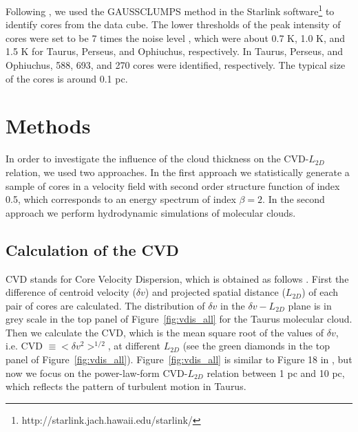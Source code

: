 \documentclass[iop,revtex4]{emulateapj}
\begin{document}
Following \citet{Qian2012}, we used the GAUSSCLUMPS method in the Starlink software\footnote{http://starlink.jach.hawaii.edu/starlink/} to identify cores from the data cube. The lower thresholds of the peak intensity of cores were set to be 7 times the noise level \citep[see][]{Qian2012}, which were about 0.7 K, 1.0 K, and 1.5 K for Taurus, Perseus, and Ophiuchus, respectively. In Taurus, Perseus, and Ophiuchus, 588, 693, and 270 cores were identified, respectively. The typical size of the cores is around 0.1 pc.



\section{Methods}
\label{sec:methods}

In order to investigate the influence of the cloud thickness on the CVD-$L_{2D}$ relation, we used two approaches.
In the first approach we statistically generate a sample of cores in a velocity field with second order structure function of index 0.5, which corresponds to an energy spectrum of index $\beta=2$. In the second approach we perform hydrodynamic simulations of molecular clouds.


\subsection{Calculation of the CVD}

CVD stands for Core Velocity Dispersion, which is obtained as follows \citep{Qian2012}. First the difference of centroid velocity ($\delta v$) and projected spatial distance ($L_{2D}$) of each pair of cores are calculated. The distribution of $\delta v$ in the $\delta v - L_{2D}$ plane is in grey scale in the top panel of Figure~\ref{fig:vdis_all} for the Taurus molecular cloud. Then we calculate the CVD, which is the mean square root of the values of $\delta v$, i.e. CVD $\equiv <\delta v^2>^{1/2}$,  at different $L_{2D}$ (see the green diamonds in the top panel of Figure~\ref{fig:vdis_all}). Figure~\ref{fig:vdis_all} is similar to Figure 18 in \cite{Qian2012}, but now we focus on the power-law-form CVD-$L_{2D}$ relation between 1 pc and 10 pc, which reflects the pattern of turbulent motion in Taurus.
\end{document}
